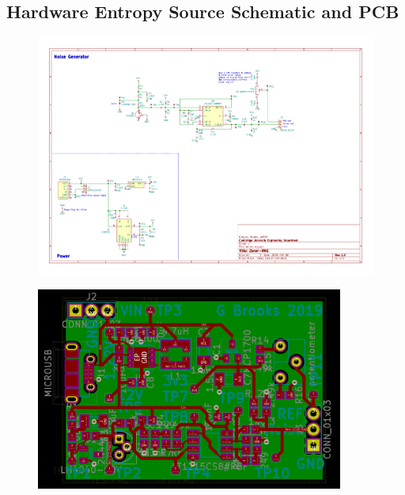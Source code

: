 \documentclass[12pt]{article}
\begin{document}
\begin{appendix}
  \newpage
  \section{Hardware Entropy Source Schematic and PCB} \label{appendix:schematic}
  \vspace{-1cm}
    \begin{figure}[H]
      \centering
      \includegraphics[angle=90,width=\textwidth]{fig/schematic.pdf}
      \label{fig:schematic}
    \end{figure}

    \newpage

    \vspace{-1.5cm}
    \begin{figure}[H]
      \centering
      \includegraphics[angle=90, width=0.9\textwidth]{fig/pcb.PNG}
      \label{fig:pcb}
    \end{figure}


\end{appendix}
\end{document}

